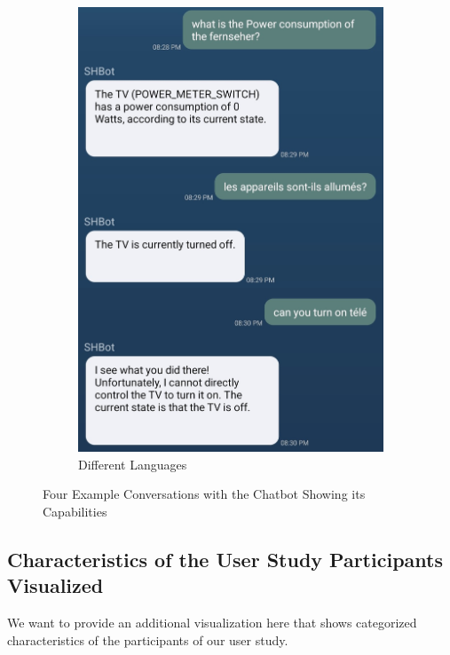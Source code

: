 \begin{figure}[htbp]
\begin{subfigure}{.4\textwidth}
        \includegraphics[width=\textwidth]{graphics/differentlanguages.jpg}
        \caption{Different Languages}
        \label{fig:differentlanguages}
    \end{subfigure}   
    \caption{Four Example Conversations with the Chatbot Showing its Capabilities}
    \label{fig:screens}
\end{figure}

\newpage
\subsection{Characteristics of the User Study Participants Visualized}
\label{sec:participant-vis}
We want to provide an additional visualization here that shows categorized characteristics of the participants of our user study.

